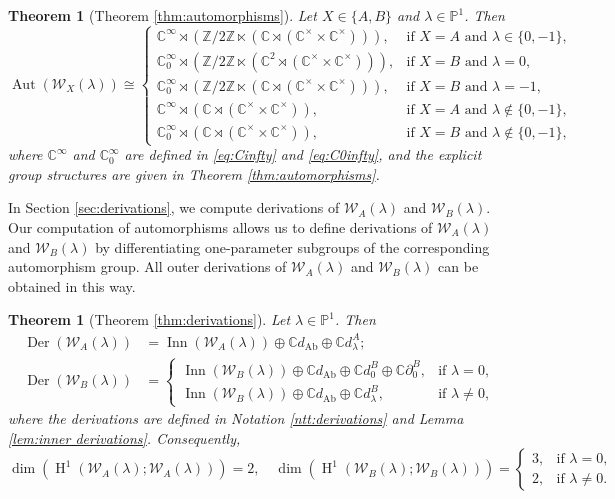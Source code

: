 \documentclass[11pt, svgnames]{amsart}
\newcommand{\ZZ}{\mathbb{Z}}
\newcommand{\CC}{\mathbb{C}}
\newcommand{\PP}{\mathbb{P}}
\newcommand{\W}{\mathcal{W}}
\DeclareMathOperator{\Der}{Der}
\DeclareMathOperator{\Inn}{Inn}
\DeclareMathOperator{\Aut}{Aut}
\newcommand{\del}{\partial}
\DeclareMathOperator{\HH}{H}
\DeclareMathOperator{\Ab}{Ab}
\newtheorem{theorem}[proposition]{Theorem}
\theoremstyle{definition}
\begin{document}
\begin{theorem}[Theorem \ref{thm:automorphisms}]\label{thm:intro automorphisms}
    Let $X \in \{A,B\}$ and $\lambda \in \PP^1$. Then
    $$\Aut(\W_X(\lambda)) \cong \begin{cases}
        \CC^\infty \rtimes (\ZZ/2\ZZ \ltimes (\CC \rtimes (\CC^\times \times \CC^\times))), &\text{if } X = A \text{ and } \lambda \in \{0,-1\}, \\
        \CC^\infty_0 \rtimes (\ZZ/2\ZZ \ltimes (\CC^2 \rtimes (\CC^\times \times \CC^\times))), &\text{if } X = B \text{ and } \lambda = 0, \\
        \CC^\infty_0 \rtimes (\ZZ/2\ZZ \ltimes (\CC \rtimes (\CC^\times \times \CC^\times))), &\text{if } X = B \text{ and } \lambda = -1, \\
        \CC^\infty \rtimes (\CC \rtimes (\CC^\times \times \CC^\times)), &\text{if } X = A \text{ and } \lambda \notin \{0,-1\}, \\
        \CC^\infty_0 \rtimes (\CC \rtimes (\CC^\times \times \CC^\times)), &\text{if } X = B \text{ and } \lambda \notin \{0,-1\},
    \end{cases}$$
    where $\CC^\infty$ and $\CC_0^\infty$ are defined in \eqref{eq:Cinfty} and \eqref{eq:C0infty}, and the explicit group structures are given in Theorem \ref{thm:automorphisms}.
\end{theorem}

In Section \ref{sec:derivations}, we compute derivations of $\W_A(\lambda)$ and $\W_B(\lambda)$. Our computation of automorphisms allows us to define derivations of $\W_A(\lambda)$ and $\W_B(\lambda)$ by differentiating one-parameter subgroups of the corresponding automorphism group. All outer derivations of $\W_A(\lambda)$ and $\W_B(\lambda)$ can be obtained in this way.

\begin{theorem}[Theorem \ref{thm:derivations}]\label{thm:intro derivations}
    Let $\lambda \in \PP^1$. Then
    \begin{align*}
        \Der(\W_A(\lambda)) &= \Inn(\W_A(\lambda)) \oplus \CC d_{\Ab} \oplus \CC d_\lambda^A; \\
        \Der(\W_B(\lambda)) &= \begin{cases}
            \Inn(\W_B(\lambda)) \oplus \CC d_{\Ab} \oplus \CC d_0^B \oplus \CC \del_0^B, &\text{if } \lambda = 0, \\
            \Inn(\W_B(\lambda)) \oplus \CC d_{\Ab} \oplus \CC d_\lambda^B, &\text{if } \lambda \neq 0,
        \end{cases}
    \end{align*}
    where the derivations are defined in Notation \ref{ntt:derivations} and Lemma \ref{lem:inner derivations}. Consequently,
    $$\dim(\HH^1(\W_A(\lambda);\W_A(\lambda))) = 2, \quad \dim(\HH^1(\W_B(\lambda);\W_B(\lambda))) = \begin{cases}
        3, &\text{if } \lambda = 0, \\
        2, &\text{if } \lambda \neq 0.
    \end{cases}$$
\end{theorem}
\end{document}
